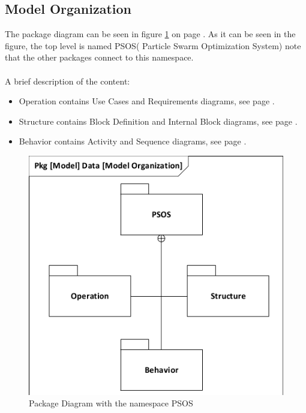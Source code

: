 \subsection{Model Organization}
The package diagram can be seen in figure \ref{fig:pkg} on page \pageref{fig:pkg}. As it can be seen in the figure, the top level is named PSOS( Particle Swarm Optimization System) note that the other packages connect to this namespace.
\\\\
A brief description of the content:
\begin{itemize}
	\item Operation contains Use Cases and Requirements diagrams, see page \pageref{requirementspecification:usecasediagrams}.
	\item Structure contains Block Definition and Internal Block diagrams, see page \pageref{requirementspecification:Structure}.
	\item Behavior contains Activity and Sequence diagrams, see page \pageref{requirementspecification:Behavior}.

\end{itemize}

\begin{figure}[H]
	\centering
	\includegraphics[width=0.7\linewidth]{diagram/pkg_data_model_organization.pdf}
	\caption{Package Diagram with the namespace PSOS}
	\label{fig:pkg}
\end{figure}